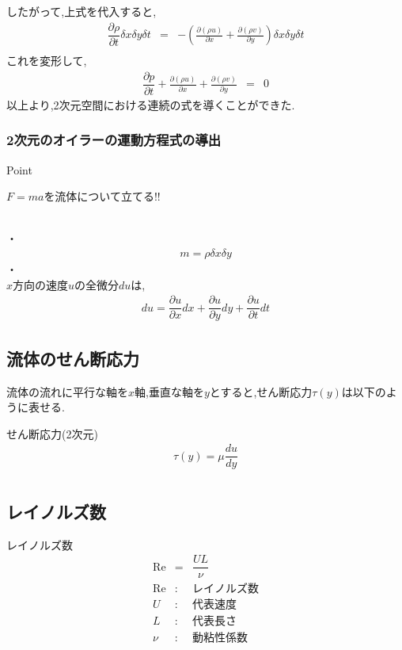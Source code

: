 \documentclass[a4paper]{jsarticle}
\begin{document}
したがって,上式を代入すると,
\begin{eqnarray*}
    \dfrac{\partial \rho}{\partial t}\delta x \delta y \delta t&=&-\left(\frac{\partial\left(\rho u\right)}{\partial x}+\frac{\partial\left(\rho v\right)}{\partial y}\right)\delta x \delta y \delta t\\
\end{eqnarray*}
これを変形して,
\begin{eqnarray*}
    \dfrac{\partial p}{\partial t}+\frac{\partial\left(\rho u\right)}{\partial x}+\frac{\partial\left(\rho v\right)}{\partial y}&=&0
\end{eqnarray*}
以上より,2次元空間における連続の式を導くことができた.
\subsubsection{2次元のオイラーの運動方程式の導出}
\begin{itembox}[l]{Point}
    \begin{center}
        \quad$F=ma$を流体について立てる!!
    \end{center}
\end{itembox}
\\
・\\
\begin{eqnarray*}
    m=\rho \delta x \delta y
\end{eqnarray*}
・\\
$x$方向の速度$u$の全微分$du$は,
\begin{eqnarray*}
    du=\dfrac{\partial u}{\partial x}dx+\dfrac{\partial u}{\partial y}dy+\dfrac{\partial u}{\partial t}dt
\end{eqnarray*}
\subsection{流体のせん断応力}
流体の流れに平行な軸を$x$軸,垂直な軸を$y$とすると,せん断応力$\tau\left(y\right)$は以下のように表せる.
\begin{itembox}[l]{せん断応力(2次元)}
    \begin{eqnarray*}
        \tau\left(y\right)=\mu\dfrac{du}{dy}\\
    \end{eqnarray*}
\end{itembox}
\subsection{レイノルズ数}
\begin{itembox}[l]{レイノルズ数}
    \begin{eqnarray*}
        \mathrm{Re}&=&\dfrac{UL}{\nu}\\
        \mathrm{Re} &:& レイノルズ数\\
        U &:& 代表速度\\
        L &:& 代表長さ\\
        \nu &:& 動粘性係数\\
    \end{eqnarray*}
\end{itembox}
\end{document}
